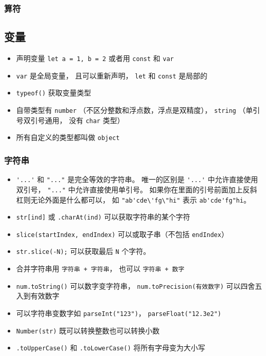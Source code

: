 \subsubsection{算符}

\subsection{变量}
\begin{itemize}
\item 声明变量 \verb`let a = 1, b = 2` 或者用 \verb`const` 和 \verb`var`
\item \verb`var` 是全局变量， 且可以重新声明， \verb`let` 和 \verb`const` 是局部的
\item \verb`typeof()` 获取变量类型
\item 自带类型有 \verb`number` （不区分整数和浮点数，浮点是双精度）， \verb`string` （单引号双引号通用， 没有 \verb`char` 类型）
\item 所有自定义的类型都叫做 \verb`object`
\end{itemize}

\subsubsection{字符串}
\begin{itemize}
\item \verb`'...'` 和 \verb`"..."` 是完全等效的字符串。 唯一的区别是 \verb`'...'` 中允许直接使用双引号， \verb`"..."` 中允许直接使用单引号。 如果你在里面的引号前面加上反斜杠则无论外面是什么都可以， 如 \verb`"ab'cde\'fg\"hi"` 表示 \verb`ab'cde'fg"hi`。
\item \verb`str[ind]` 或 \verb`.charAt(ind)` 可以获取字符串的某个字符
\item \verb`slice(startIndex, endIndex)` 可以或取子串（不包括 \verb`endIndex`）
\item \verb`str.slice(-N);` 可以获取最后 \verb`N` 个字符。
\item 合并字符串用 \verb`字符串 + 字符串`， 也可以 \verb`字符串 + 数字`
\item \verb`num.toString()` 可以数字变字符串， \verb`num.toPrecision(有效数字)` 可以四舍五入到有效数字
\item 可以字符串变数字如 \verb`parseInt("123")`， \verb`parseFloat("12.3e2")`
\item \verb`Number(str)` 既可以转换整数也可以转换小数
\item \verb`.toUpperCase()` 和 \verb`.toLowerCase()` 将所有字母变为大小写
\end{itemize}


